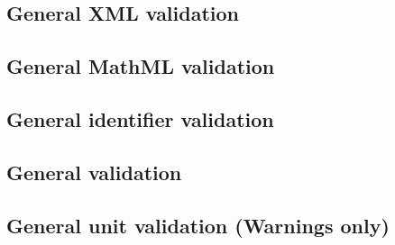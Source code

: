 \subsection*{General XML validation} \begin{sbmlenum}


\end{sbmlenum} \subsection*{General MathML validation} \begin{sbmlenum}




\end{sbmlenum} \subsection*{General identifier validation}  \begin{sbmlenum}


\end{sbmlenum} \subsection*{General  validation} \begin{sbmlenum}


\end{sbmlenum} \subsection*{General unit validation (Warnings only)} \begin{sbmlenum}


\end{sbmlenum}
